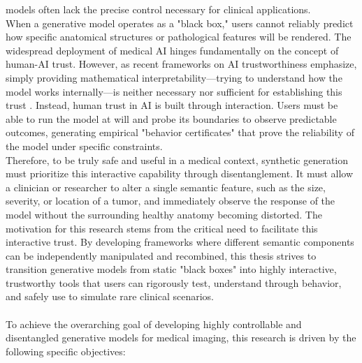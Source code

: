 models often lack the precise control necessary for clinical applications. \\
When a generative model operates as a "black box," users cannot 
reliably predict how specific anatomical structures or pathological features will be rendered. The widespread deployment of medical AI hinges 
fundamentally on the concept of human-AI trust. However, as recent frameworks on AI trustworthiness emphasize, simply providing mathematical 
interpretability—trying to understand how the model works internally—is neither necessary nor sufficient for establishing this trust \cite{shen2022trustaiinterpretabilitynecessary}. 
Instead, human trust in AI is built through interaction. Users must be able to run the model at will and probe its boundaries to observe 
predictable outcomes, generating empirical "behavior certificates" that prove the reliability of the model under specific constraints. \\
Therefore, to be truly safe and useful in a medical context, synthetic generation must prioritize this interactive capability through disentanglement. 
It must allow a clinician or researcher to alter a single semantic feature, such as the size, severity, or location of a tumor, and immediately observe 
the response of the model without the surrounding healthy anatomy becoming distorted. The motivation for this research stems from the critical need to 
facilitate this interactive trust. By developing frameworks where different semantic components can be independently manipulated and recombined, 
this thesis strives to transition generative models from static "black boxes" into highly interactive, trustworthy tools that users can rigorously 
test, understand through behavior, and safely use to simulate rare clinical scenarios. \\
\\
To achieve the overarching goal of developing highly controllable and disentangled generative models for medical imaging, this research is driven 
by the following specific objectives:
